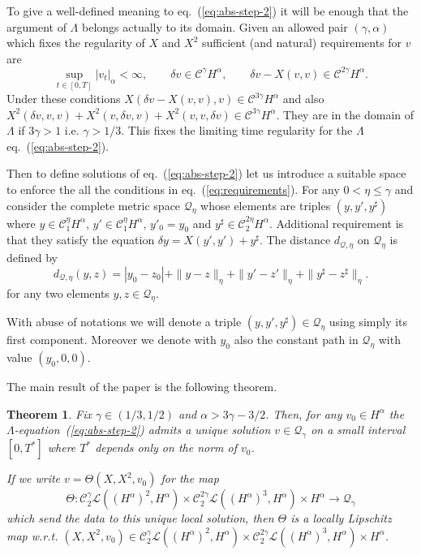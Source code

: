 \documentclass[a4paper,11pt,reqno]{article}
\newcommand{\der}{\delta}
\newcommand{\CC}{\mathcal{C}}
\newcommand{\QQ}{\mathcal{Q}}
\newcommand{\LL}{\mathcal{L}}
\newtheorem{theorem}{Theorem}
\begin{document}
To give a well-defined meaning to eq.~(\ref{eq:abs-step-2}) it will be enough that the argument of $\Lambda$ belongs actually to its domain. Given an allowed pair $(\gamma,\alpha)$ which fixes the regularity of $X$ and $X^2$ sufficient (and natural) requirements for $v$ are
\begin{equation}
  \label{eq:requirements}
\sup_{t\in[0,T]}|v_t|_\alpha <\infty,\qquad  \der v \in \CC^\gamma H^\alpha,\qquad \der v - X(v,v) \in \CC^{2\gamma} H^\alpha.   
\end{equation}
Under these conditions $X(\der v- X(v,v),v) \in \CC^{3\gamma} H^\alpha$ and also $X^2(\der v,v,v) +
X^2(v,\der v,v) + X^2( v,v,\der v) \in \CC^{3\gamma} H^\alpha$. They are in the domain of $\Lambda$ if $3\gamma > 1$ i.e. $\gamma > 1/3$. This fixes the limiting time regularity for the $\Lambda$ eq.~(\ref{eq:abs-step-2}).

Then to define solutions of eq.~(\ref{eq:abs-step-2}) let us introduce a suitable  space to enforce the all the conditions in eq.~(\ref{eq:requirements}).
For any $0 < \eta \le \gamma$ and consider the complete metric space $\QQ_\eta$ whose elements are triples $(y,y',y^\sharp)$
where $y \in \CC_1^\eta H^\alpha$, $y' \in \CC_1^\eta H^\alpha$, $y'_0 = y_0$ and $y^\sharp \in \CC_2^{2\eta}
H^\alpha$. Additional requirement is that they satisfy the equation $\der y = X(y',y') +
y^\sharp$.  The distance $d_{\QQ,\eta}$ on $\QQ_\eta$ is defined by
$$
d_{\QQ,\eta}(y,z) = |y_0-z_0| + \|y-z\|_{\eta} + \|y'-z'\|_{\eta} + \|y^\sharp-z^{\sharp}\|_{\eta}. 
$$
for any two elements $y,z \in \QQ_\eta$. 

With abuse of notations we will denote a triple
$(y,y',y^\sharp) \in \QQ_\eta$ using simply its first component.
Moreover  we denote with $y_0$ also the constant path in $\QQ_\eta$ with value $(y_0,0,0)$. 

The main result of the paper is the following theorem.

\begin{theorem}
\label{thm:main}
Fix $\gamma \in (1/3,1/2)$ and $\alpha > 3\gamma -3/2$. Then, for any
$v_0 \in H^\alpha$ 
the $\Lambda$-equation~(\ref{eq:abs-step-2}) admits a unique solution
$v \in \QQ_\gamma$ on a small
interval $[0,T^*]$ where $T^*$ depends only on the norm of $v_0$.

If we write $v = \Theta(X,X^2,v_0)$ for the map 
$$
\Theta: \CC^\gamma_2 \LL((H^\alpha)^2,H^\alpha) \times \CC^{2\gamma}_2 \LL((H^\alpha)^3,H^\alpha) \times H^\alpha \to \QQ_\gamma
$$ which send the data to this unique local solution, then $\Theta$ is a locally Lipschitz map w.r.t. $(X,X^2,v_0) \in \CC^\gamma_2 \LL((H^\alpha)^2,H^\alpha) \times \CC^{2\gamma}_2 \LL((H^\alpha)^3,H^\alpha) \times H^\alpha$. 
\end{theorem}
\end{document}
